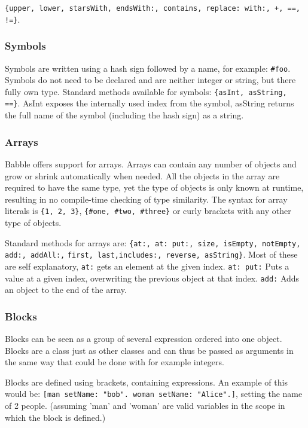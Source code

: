 \documentclass[a4paper]{article}
\begin{document}
\verb|{upper, lower, starsWith, endsWith:, contains, replace: with:, +, ==, !=}|.

\subsubsection{Symbols}

Symbols are written using a hash sign followed by a name, for example: \verb|#foo|. Symbols do not need to be declared and are neither integer or string, but there fully own type. Standard methods available for symbols:
\verb|{asInt, asString, ==}|. AsInt exposes the internally used index from the symbol, asString returns the full name of the symbol (including the hash sign) as a string.

\subsubsection{Arrays}

Babble offers support for arrays. Arrays can contain any number of objects and grow or shrink automatically when needed. All the objects in the array are required to have the same type, yet the type of objects is only known at runtime, resulting in no compile-time checking of type similarity. The syntax for array literals is \verb|{1, 2, 3}|, \verb|{#one, #two, #three}| or curly brackets with any other type of objects.

Standard methods for arrays are:
\verb|{at:, at: put:, size, isEmpty, notEmpty, add:, addAll:,|
\verb|first, last,includes:, reverse, asString}|. Most of these are self explanatory, \verb|at:| gets an element at the given index. \verb|at: put:| Puts a value at a given index, overwriting the previous object at that index. \verb|add:| Adds an object to the end of the array.


\subsubsection{Blocks}

Blocks can be seen as a group of several expression ordered into one object. Blocks are a class just as other classes and can thus be passed as arguments in the same way that could be done with for example integers.

Blocks are defined using brackets, containing expressions. An example of this would be:
\verb|[man setName: "bob". woman setName: "Alice".]|, setting the name of 2 people. (assuming 'man' and 'woman' are valid variables in the scope in which the block is defined.)
\end{document}
